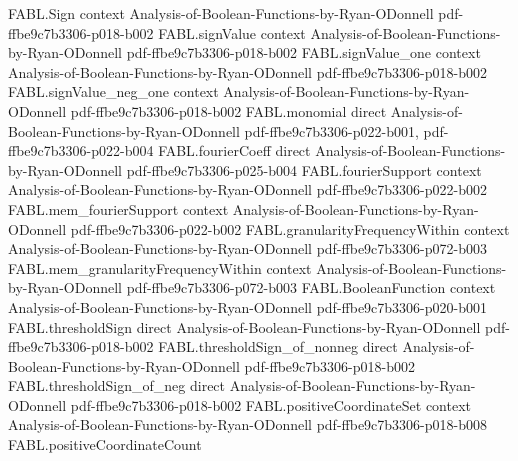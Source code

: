 \begin{theorem}
\label{FABL.isPivotal_signProdDimensionEdgeEquiv_iff}
\leanok
{}
\proofstep
  {FABL.Sign}
  {context}
  {Analysis-of-Boolean-Functions-by-Ryan-ODonnell}
  {pdf-ffbe9c7b3306-p018-b002}
\proofstep
  {FABL.signValue}
  {context}
  {Analysis-of-Boolean-Functions-by-Ryan-ODonnell}
  {pdf-ffbe9c7b3306-p018-b002}
\proofstep
  {FABL.signValue_one}
  {context}
  {Analysis-of-Boolean-Functions-by-Ryan-ODonnell}
  {pdf-ffbe9c7b3306-p018-b002}
\proofstep
  {FABL.signValue_neg_one}
  {context}
  {Analysis-of-Boolean-Functions-by-Ryan-ODonnell}
  {pdf-ffbe9c7b3306-p018-b002}
\proofstep
  {FABL.monomial}
  {direct}
  {Analysis-of-Boolean-Functions-by-Ryan-ODonnell}
  {pdf-ffbe9c7b3306-p022-b001,
    pdf-ffbe9c7b3306-p022-b004}
\proofstep
  {FABL.fourierCoeff}
  {direct}
  {Analysis-of-Boolean-Functions-by-Ryan-ODonnell}
  {pdf-ffbe9c7b3306-p025-b004}
\proofstep
  {FABL.fourierSupport}
  {context}
  {Analysis-of-Boolean-Functions-by-Ryan-ODonnell}
  {pdf-ffbe9c7b3306-p022-b002}
\proofstep
  {FABL.mem_fourierSupport}
  {context}
  {Analysis-of-Boolean-Functions-by-Ryan-ODonnell}
  {pdf-ffbe9c7b3306-p022-b002}
\proofstep
  {FABL.granularityFrequencyWithin}
  {context}
  {Analysis-of-Boolean-Functions-by-Ryan-ODonnell}
  {pdf-ffbe9c7b3306-p072-b003}
\proofstep
  {FABL.mem_granularityFrequencyWithin}
  {context}
  {Analysis-of-Boolean-Functions-by-Ryan-ODonnell}
  {pdf-ffbe9c7b3306-p072-b003}
\proofstep
  {FABL.BooleanFunction}
  {context}
  {Analysis-of-Boolean-Functions-by-Ryan-ODonnell}
  {pdf-ffbe9c7b3306-p020-b001}
\proofstep
  {FABL.thresholdSign}
  {direct}
  {Analysis-of-Boolean-Functions-by-Ryan-ODonnell}
  {pdf-ffbe9c7b3306-p018-b002}
\proofstep
  {FABL.thresholdSign_of_nonneg}
  {direct}
  {Analysis-of-Boolean-Functions-by-Ryan-ODonnell}
  {pdf-ffbe9c7b3306-p018-b002}
\proofstep
  {FABL.thresholdSign_of_neg}
  {direct}
  {Analysis-of-Boolean-Functions-by-Ryan-ODonnell}
  {pdf-ffbe9c7b3306-p018-b002}
\proofstep
  {FABL.positiveCoordinateSet}
  {context}
  {Analysis-of-Boolean-Functions-by-Ryan-ODonnell}
  {pdf-ffbe9c7b3306-p018-b008}
\proofstep
  {FABL.positiveCoordinateCount}

\end{theorem}
